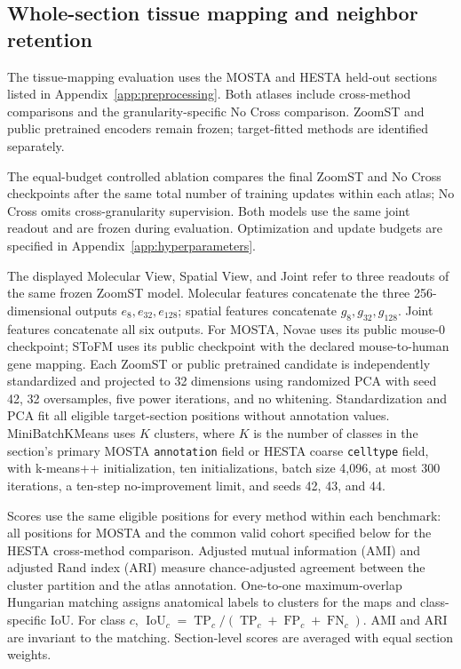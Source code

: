 \subsection{Whole-section tissue mapping and neighbor retention}
\label{app:dual-view}

The tissue-mapping evaluation uses the MOSTA and HESTA held-out sections listed in Appendix~\ref{app:preprocessing}. Both atlases include cross-method comparisons and the granularity-specific No Cross comparison. ZoomST and public pretrained encoders remain frozen; target-fitted methods are identified separately.

The equal-budget controlled ablation compares the final ZoomST and No Cross checkpoints after the same total number of training updates within each atlas; No Cross omits cross-granularity supervision. Both models use the same joint readout and are frozen during evaluation. Optimization and update budgets are specified in Appendix~\ref{app:hyperparameters}.

The displayed Molecular View, Spatial View, and Joint refer to three readouts of the same frozen ZoomST model. Molecular features concatenate the three 256-dimensional outputs $e_8,e_{32},e_{128}$; spatial features concatenate $g_8,g_{32},g_{128}$. Joint features concatenate all six outputs. For MOSTA, Novae uses its public mouse-0 checkpoint; SToFM uses its public checkpoint with the declared mouse-to-human gene mapping. Each ZoomST or public pretrained candidate is independently standardized and projected to 32 dimensions using randomized PCA with seed 42, 32 oversamples, five power iterations, and no whitening. Standardization and PCA fit all eligible target-section positions without annotation values. MiniBatchKMeans uses $K$ clusters, where $K$ is the number of classes in the section's primary MOSTA \texttt{annotation} field or HESTA coarse \texttt{celltype} field, with k-means++ initialization, ten initializations, batch size 4,096, at most 300 iterations, a ten-step no-improvement limit, and seeds 42, 43, and 44.

Scores use the same eligible positions for every method within each benchmark: all positions for MOSTA and the common valid cohort specified below for the HESTA cross-method comparison. Adjusted mutual information (AMI) and adjusted Rand index (ARI) measure chance-adjusted agreement between the cluster partition and the atlas annotation. One-to-one maximum-overlap Hungarian matching assigns anatomical labels to clusters for the maps and class-specific IoU. For class $c$, $\operatorname{IoU}_c=\operatorname{TP}_c/(\operatorname{TP}_c+\operatorname{FP}_c+\operatorname{FN}_c)$. AMI and ARI are invariant to the matching. Section-level scores are averaged with equal section weights.

